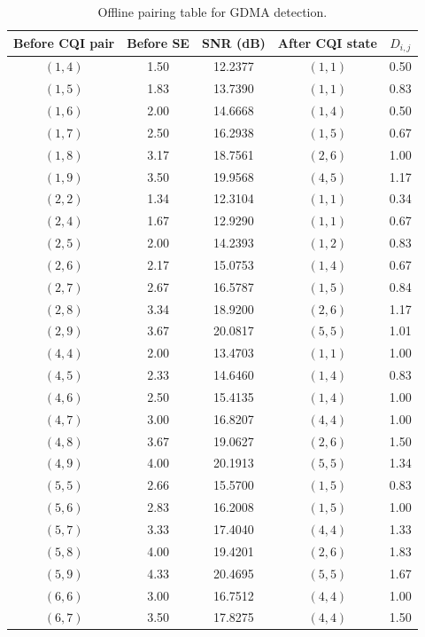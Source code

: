 \begin{table}[p]
\centering
\normalsize
\setlength{\tabcolsep}{6pt}
\renewcommand{\arraystretch}{1.2}
\caption{Offline pairing table for GDMA detection.}
\label{tab:gdma-offline-pairing}
\begin{tabular}{@{}ccccc@{}}
\toprule
Before CQI pair & Before SE & SNR (dB) & After CQI state & $D_{i,j}$ \\
\midrule
$(1,4)$ & 1.50 & 12.2377 & $(1,1)$ & 0.50 \\
$(1,5)$ & 1.83 & 13.7390 & $(1,1)$ & 0.83 \\
$(1,6)$ & 2.00 & 14.6668 & $(1,4)$ & 0.50 \\
$(1,7)$ & 2.50 & 16.2938 & $(1,5)$ & 0.67 \\
$(1,8)$ & 3.17 & 18.7561 & $(2,6)$ & 1.00 \\
$(1,9)$ & 3.50 & 19.9568 & $(4,5)$ & 1.17 \\
$(2,2)$ & 1.34 & 12.3104 & $(1,1)$ & 0.34 \\
$(2,4)$ & 1.67 & 12.9290 & $(1,1)$ & 0.67 \\
$(2,5)$ & 2.00 & 14.2393 & $(1,2)$ & 0.83 \\
$(2,6)$ & 2.17 & 15.0753 & $(1,4)$ & 0.67 \\
$(2,7)$ & 2.67 & 16.5787 & $(1,5)$ & 0.84 \\
$(2,8)$ & 3.34 & 18.9200 & $(2,6)$ & 1.17 \\
$(2,9)$ & 3.67 & 20.0817 & $(5,5)$ & 1.01 \\
$(4,4)$ & 2.00 & 13.4703 & $(1,1)$ & 1.00 \\
$(4,5)$ & 2.33 & 14.6460 & $(1,4)$ & 0.83 \\
$(4,6)$ & 2.50 & 15.4135 & $(1,4)$ & 1.00 \\
$(4,7)$ & 3.00 & 16.8207 & $(4,4)$ & 1.00 \\
$(4,8)$ & 3.67 & 19.0627 & $(2,6)$ & 1.50 \\
$(4,9)$ & 4.00 & 20.1913 & $(5,5)$ & 1.34 \\
$(5,5)$ & 2.66 & 15.5700 & $(1,5)$ & 0.83 \\
$(5,6)$ & 2.83 & 16.2008 & $(1,5)$ & 1.00 \\
$(5,7)$ & 3.33 & 17.4040 & $(4,4)$ & 1.33 \\
$(5,8)$ & 4.00 & 19.4201 & $(2,6)$ & 1.83 \\
$(5,9)$ & 4.33 & 20.4695 & $(5,5)$ & 1.67 \\
$(6,6)$ & 3.00 & 16.7512 & $(4,4)$ & 1.00 \\
$(6,7)$ & 3.50 & 17.8275 & $(4,4)$ & 1.50 \\

\end{tabular}
\end{table}
